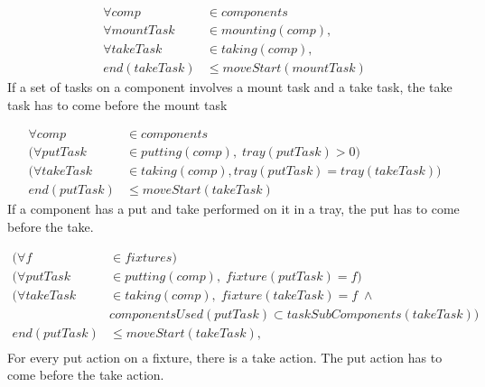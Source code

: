 \documentclass[10pt,a4paper]{report}
\begin{document}
\begin{equation}
\begin{aligned}\label{eq:97}
\forall comp &\in components \\
\forall mountTask &\in mounting(comp), \\
\forall takeTask &\in taking(comp), \\
end(takeTask) &\le moveStart(mountTask)
\end{aligned}
\end{equation}
If a set of tasks on a component involves a mount task and a take task, the take task has to come before the mount task


\begin{equation}
\begin{aligned}\label{eq:98}
\forall comp &\in components \\
(\forall putTask &\in putting(comp), \; tray(putTask) > 0)\\
(\forall takeTask &\in taking(comp), tray(putTask) = tray(takeTask))\\
end(putTask) &\le moveStart(takeTask)
\end{aligned}
\end{equation}
If a component has a put and take performed on it in a tray, the put has to come before the take.


\begin{equation}
\begin{aligned}\label{eq:99}
(\forall f &\in fixtures) \\
(\forall putTask &\in putting(comp), \; fixture(putTask) = f)\\
(\forall takeTask &\in taking(comp), \; fixture(takeTask) = f \; \land \\
&componentsUsed(putTask) \subset taskSubComponents(takeTask)) \\
end(putTask) &\le moveStart(takeTask), \\
\end{aligned}
\end{equation}
For every put action on a fixture, there is a take action. The put action has to come before the take action.
\end{document}
